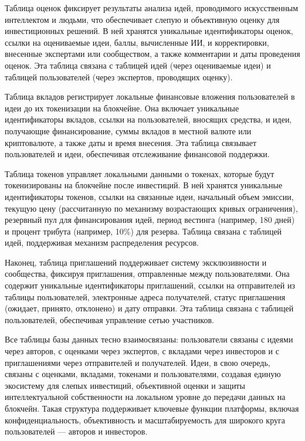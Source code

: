\documentclass[
    14pt,
    specialist,
    candidate, %
    subf, %
    href,
    times,
    dotsinheaders=false,
    colorlinks=false
]{disser}
\begin{document}
Таблица оценок фиксирует результаты анализа идей, проводимого искусственным интеллектом и людьми, что обеспечивает слепую и объективную оценку для инвестиционных решений. В ней хранятся уникальные идентификаторы оценок, ссылки на оцениваемые идеи, баллы, вычисленные ИИ, и корректировки, внесенные экспертами или сообществом, а также комментарии и даты проведения оценок. Эта таблица связана с таблицей идей (через оцениваемые идеи) и таблицей пользователей (через экспертов, проводящих оценку).

Таблица вкладов регистрирует локальные финансовые вложения пользователей в идеи до их токенизации на блокчейне. Она включает уникальные идентификаторы вкладов, ссылки на пользователей, вносящих средства, и идеи, получающие финансирование, суммы вкладов в местной валюте или криптовалюте, а также даты и время внесения. Эта таблица связывает пользователей и идеи, обеспечивая отслеживание финансовой поддержки.

Таблица токенов управляет локальными данными о токенах, которые будут токенизированы на блокчейне после инвестиций. В ней хранятся уникальные идентификаторы токенов, ссылки на связанные идеи, начальный объем эмиссии, текущую цену (рассчитанную по механизму возрастающих кривых ограничения), резервный пул для финансирования идей, период вестинга (например, 180 дней) и процент трибута (например, 10\%) для резерва. Таблица связана с таблицей идей, поддерживая механизм распределения ресурсов.

Наконец, таблица приглашений поддерживает систему эксклюзивности и сообщества, фиксируя приглашения, отправленные между пользователями. Она содержит уникальные идентификаторы приглашений, ссылки на отправителей из таблицы пользователей, электронные адреса получателей, статус приглашения (ожидает, принято, отклонено) и дату отправки. Эта таблица связана с таблицей пользователей, обеспечивая управление сетью участников.

Все таблицы базы данных тесно взаимосвязаны: пользователи связаны с идеями через авторов, с оценками через экспертов, с вкладами через инвесторов и с приглашениями через отправителей и получателей. Идеи, в свою очередь, связаны с оценками, вкладами, токенами и пользователями, создавая единую экосистему для слепых инвестиций, объективной оценки и защиты интеллектуальной собственности на локальном уровне до передачи данных на блокчейн. Такая структура поддерживает ключевые функции платформы, включая конфиденциальность, объективность и масштабируемость для широкого круга пользователей — авторов и инвесторов.
\end{document}
